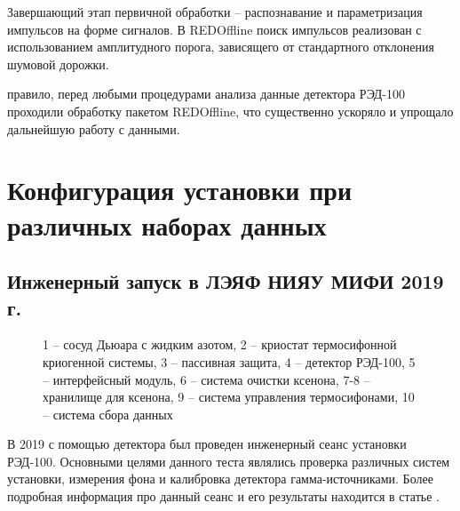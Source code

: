 Завершающий этап первичной обработки -- распознавание и параметризация импульсов на форме сигналов. В REDOffline поиск импульсов реализован с использованием амплитудного порога, зависящего от стандартного отклонения шумовой дорожки.

 правило, перед любыми процедурами анализа данные детектора РЭД-100 проходили обработку пакетом REDOffline, что существенно ускоряло и упрощало дальнейшую работу с данными.


\section{Конфигурация установки при различных наборах данных}
\label{sect2_2}
\subsection{Инженерный запуск в ЛЭЯФ НИЯУ МИФИ 2019 г.}
\label{subsect2_2_1}
\begin{figure}[H]
	\caption[Схема установки при инженерном запуске в МИФИ.] {1 -- сосуд Дьюара с жидким азотом, 2 -- криостат термосифонной криогенной системы, 3 -- пассивная защита, 4 -- детектор РЭД-100, 5 -- интерфейсный модуль, 6 -- система очистки ксенона, 7-8 -- хранилище для ксенона, 9 -- система управления термосифонами, 10 -- система сбора данных}
	\label{img:2019scheme}
\end{figure}
В 2019 с помощью детектора был проведен инженерный сеанс установки РЭД-100. Основными целями данного теста являлись проверка различных систем установки, измерения фона и калибровка детектора гамма-источниками. Более подробная информация про данный сеанс и его результаты находится в статье \cite{RED100_2019}. %
